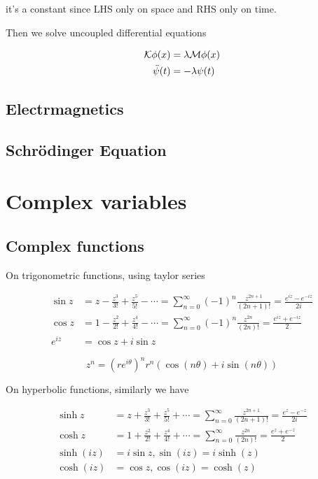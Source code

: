 \documentclass{article}
\begin{document}
it's a constant since LHS only on space and RHS only on time.

Then we solve uncoupled differential equations

\begin{align*}
    \mathcal{K} \phi(x) &=\lambda\mathcal{M} \phi(x)\\
    \ddot\psi(t) &= -\lambda \psi(t)
\end{align*}
\subsection{Electrmagnetics}
\subsection{Schr\"odinger Equation}

\section{Complex variables}

\subsection{Complex functions}

On trigonometric functions, using taylor series

\begin{align*}
    \sin z &= z-\frac{z^3}{3!}+\frac{z^5}{5!}-\cdots = \sum_{n=0}^\infty (-1)^n \frac{z^{2n+1}}{(2n+1)!}=\frac{e^{iz}-e^{-iz}}{2i}\\
    \cos z &= 1-\frac{z^2}{2!}+\frac{z^4}{4!}-\cdots = \sum_{n=0}^\infty (-1)^n \frac{z^{2n}}{(2n)!}=\frac{e^{iz}+e^{-iz}}{2}\\
    e^{iz} &= \cos z+i\sin z
\end{align*}

\begin{theorem}
    \[z^n = (re^{i\theta})^n r^n (\cos(n\theta)+i\sin(n\theta))\]
\end{theorem}

On hyperbolic functions, similarly we have

\begin{align*}
    \sinh z &= z+\frac{z^3}{3!}+\frac{z^5}{5!}+\cdots = \sum_{n=0}^\infty\frac{z^{2n+1}}{(2n+1)!}=\frac{e^{z}-e^{-z}}{2i}\\
    \cosh z &= 1+\frac{z^2}{2!}+\frac{z^4}{4!}+\cdots = \sum_{n=0}^\infty \frac{z^{2n}}{(2n)!}=\frac{e^{z}+e^{-z}}{2}\\
    \sinh(iz) &= i\sin z, \sin(iz)=i\sinh(z)\\
    \cosh(iz) &= \cos z, \cos(iz) =\cosh(z)
\end{align*}
\end{document}
